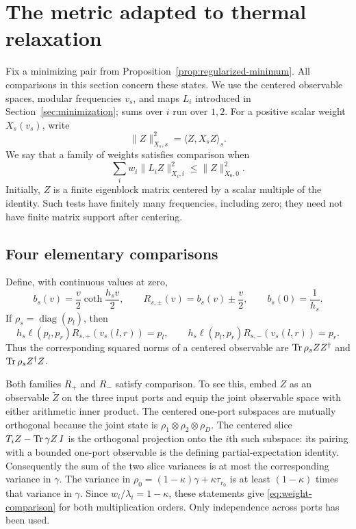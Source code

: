 \section{The metric adapted to thermal relaxation}\label{sec:metric}

Fix a minimizing pair from Proposition~\ref{prop:regularized-minimum}.
All comparisons in this section concern these states.  We use the centered
observable spaces, modular frequencies $v_s$, and maps $L_i$ introduced in
Section~\ref{sec:minimization}; sums over $i$ run over $1,2$.
For a positive scalar weight $X_s(v_s)$, write
\[
 \|Z\|_{X_s,s}^2=\langle Z,X_sZ\rangle_s.
\]
We say that a family of weights satisfies comparison when
\begin{equation}\label{eq:weight-comparison}
 \sum_i w_i\|L_iZ\|_{X_i,i}^2\le \|Z\|_{X_0,0}^2.
\end{equation}
Initially, $Z$ is a finite eigenblock matrix centered by a scalar multiple
of the identity.  Such tests have finitely many frequencies, including zero;
they need not have finite matrix support after centering.

\subsection{Four elementary comparisons}
Define, with continuous values at zero,
\[
 b_s(v)=\frac v2\coth\frac{h_sv}{2},\qquad
 R_{s,\pm}(v)=b_s(v)\pm\frac v2,
 \qquad b_s(0)=\frac1{h_s}.
\]
If $\rho_s=\operatorname{diag}(p_l)$, then
\begin{equation}\label{eq:arithmetic-weights}
 h_s\ell(p_l,p_r)R_{s,+}(v_s(l,r))=p_l,
 \qquad
 h_s\ell(p_l,p_r)R_{s,-}(v_s(l,r))=p_r.
\end{equation}
Thus the corresponding squared norms of a centered observable are
$\operatorname{Tr}\rho_sZZ^\dagger$ and $\operatorname{Tr}\rho_sZ^\dagger Z$.

Both families $R_+$ and $R_-$ satisfy comparison.  To see this, embed $Z$
as an observable $\widetilde Z$ on the three input ports and equip the
joint observable space with either arithmetic inner product.  The centered
one-port subspaces are mutually orthogonal because the joint state is
$\rho_1\otimes\rho_2\otimes\rho_D$.  The centered slice
$T_iZ-\operatorname{Tr}\gamma Z\,I$ is the orthogonal projection onto the $i$th such
subspace: its pairing with a bounded one-port observable is the defining
partial-expectation identity.  Consequently the sum of the two slice
variances is at most the corresponding variance in $\gamma$.
The variance in $\rho_0=(1-\kappa)\gamma+\kappa\tau_{r_0}$ is at least
$(1-\kappa)$ times that variance in $\gamma$.  Since
$w_i/\lambda_i=1-\kappa$, these statements give
\eqref{eq:weight-comparison} for both multiplication orders.
Only independence across ports has been used.

